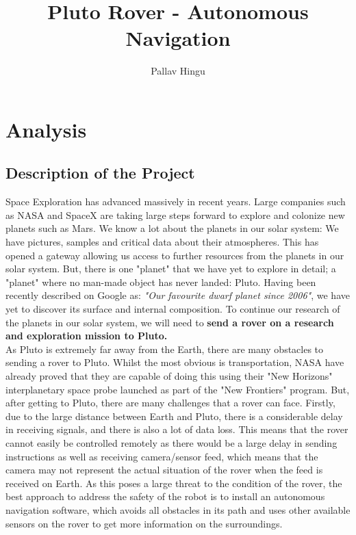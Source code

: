 \documentclass[11pt]{report}
\title{\textbf{Pluto Rover - Autonomous Navigation}}
\author{Pallav Hingu}
\date{}
\begin{document}
\maketitle
\tableofcontents

\newpage
\chapter{Analysis}

\section{Description of the Project}

Space Exploration has advanced massively in recent years. Large companies such as NASA and SpaceX are taking large steps forward to explore and colonize new planets such as Mars. We know a lot about the planets in our solar system: We have pictures, samples and critical data about their atmospheres. This has opened a gateway allowing us access to further resources from the planets in our solar system. But, there is one "planet" that we have yet to explore in detail; a "planet" where no man-made object has never landed: Pluto. Having been recently described on Google as: \emph{"Our favourite dwarf planet since 2006"}, we have yet to discover its surface and internal composition. To continue our research of the planets in our solar system, we will need to \textbf{send a rover on a research and exploration mission to Pluto.} \\

As Pluto is extremely far away from the Earth, there are many obstacles to sending a rover to Pluto. Whilst the most obvious is transportation, NASA have already proved that they are capable of doing this using their "New Horizons" interplanetary space probe launched as part of the "New Frontiers" program. But, after getting to Pluto, there are many challenges that a rover can face. Firstly, due to the large distance between Earth and Pluto, there is a considerable delay in receiving signals, and there is also a lot of data loss. This means that the rover cannot easily be controlled remotely as there would be a large delay in sending instructions as well as receiving camera/sensor feed, which means that the camera may not represent the actual situation of the rover when the feed is received on Earth. As this poses a large threat to the condition of the rover, the best approach to address the safety of the robot is to install an autonomous navigation software, which avoids all obstacles in its path and uses other available sensors on the rover to get more information on the surroundings.\\
\end{document}
